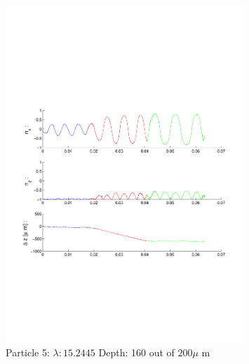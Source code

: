 \begin{figure}[H]

\includegraphics[width=0.8\textwidth]{Images/Particle 5/Particle5.pdf}

\caption{Particle 5:  $ \lambda: 15.2445$ Depth: 160 out of $200 \mu $ m}

\centering

\end{figure}

